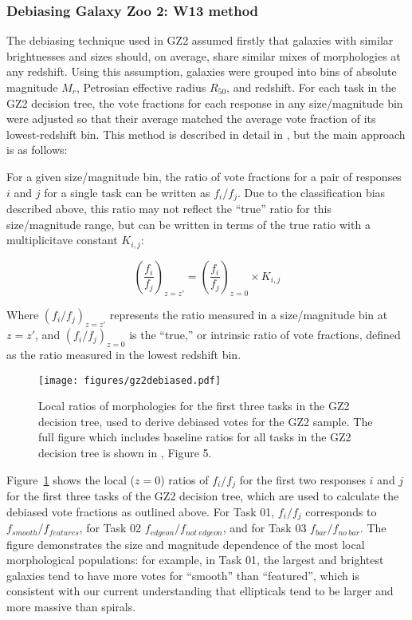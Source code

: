 \subsubsection{Debiasing Galaxy Zoo 2: W13 method}

The debiasing technique used in GZ2 assumed firstly that galaxies with similar brightnesses and sizes should, on average, share similar mixes of morphologies at any redshift. Using this assumption, galaxies were grouped into bins of absolute magnitude $M_r$, Petrosian effective radius $R_{50}$, and redshift. For each task in the GZ2 decision tree, the vote fractions for each response in any size/magnitude bin were adjusted so that their average matched the average vote fraction of its lowest-redshift bin. This method is described in detail in \citet{Willett2013}, but the main approach is as follows:

For a given size/magnitude bin, the ratio of vote fractions for a pair of responses $i$ and $j$ for a single task can be written as $f_i/f_j$. Due to the classification bias described above, this ratio may not reflect the ``true'' ratio for this size/magnitude range, but can be written in terms of the true ratio with a multiplicitave constant $K_{i,j}$:

\begin{equation}
\left(\frac{f_i}{f_j}\right)_{z=z'} = \left(\frac{f_i}{f_j}\right)_{z=0} \times K_{i,j}
\label{eqn:fvspk}
\end{equation}

Where $(f_i/f_j)_{z=z'}$ represents the ratio measured in a size/magnitude bin at $z=z'$, and $(f_i/f_j)_{z=0}$ is the ``true,'' or intrinsic ratio of vote fractions, defined as the ratio measured in the lowest redshift bin.

\begin{figure}
\centering
\texttt{[image: figures/gz2debiased.pdf]}
\caption{Local ratios of morphologies for the first three tasks in the GZ2 decision tree, used to derive debiased votes for the GZ2 sample. The full figure which includes baseline ratios for all tasks in the GZ2 decision tree is shown in \citet{Willett2013}, Figure 5.}
\label{fig:gz2debiased}
\end{figure} 

Figure~\ref{fig:gz2debiased} shows the local ($z=0$) ratios of $f_i/f_j$ for the first two responses $i$ and $j$ for the first three tasks of the GZ2 decision tree, which are used to calculate the debiased vote fractions as outlined above. For Task 01, $f_i/f_j$ corresponds to $f_{smooth}/f_{features}$, for Task 02 $f_{edgeon}/f_{not~edgeon}$, and for Task 03 $f_{bar}/f_{no~bar}.$ The figure demonstrates the size and magnitude dependence of the most local morphological populations: for example, in Task 01, the largest and brightest galaxies tend to have more votes for ``smooth'' than ``featured'', which is consistent with our current understanding that ellipticals tend to be larger and more massive than spirals. 


